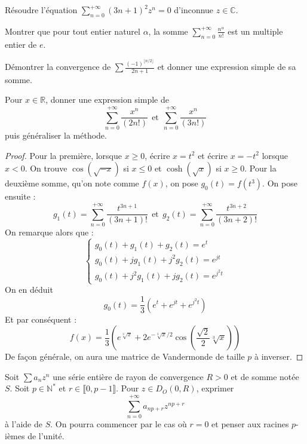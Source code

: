 \documentclass[french,a4paper]{article}
\newcommand{\N}{\mathbb{N}}
\newcommand{\R}{\mathbb{R}}
\newcommand{\C}{\mathbb{C}}
\newcommand{\st}{^*}
\theoremstyle{plain}
\theoremstyle{definition}
\theoremstyle{remark}
\begin{document}
\begin{ex}[Moulin.SE.25]{}
	Résoudre l'équation $\displaystyle\sum_{n=0}^{+\infty}(3n+1)^2z^n=0$ d'inconnue $z\in\C$.
\end{ex}

\begin{ex}[Moulin.SE.26]{}
	Montrer que pour tout entier naturel $\alpha$, la somme $\displaystyle\sum_{n=0}^{+\infty}\frac{n^\alpha}{n!}$ est un multiple entier de $e$.
\end{ex}

\begin{ex}[Moulin.SE.27]{}
	Démontrer la convergence de $\displaystyle\sum\frac{(-1)^{\lfloor n/2\rfloor}}{2n+1}$ et donner une expression simple de sa somme.
\end{ex}

\begin{ex}[Moulin.SE.28]{}
	Pour $x\in\R$, donner une expression simple de $$\sum_{n=0}^{+\infty}\frac{x^n}{(2n!)} \ \ \text{et}\ \ \sum_{n=0}^{+\infty}\frac{x^n}{(3n!)}$$ puis généraliser la méthode.
\end{ex}
\begin{proof}
	Pour la première, lorsque $x\geqslant0$, écrire $x=t^2$ et écrire $x=-t^2$ lorsque $x<0$. On trouve $\cos(\sqrt{-x})$ si $x\leqslant0$ et $\cosh(\sqrt{x})$ si $x\geqslant0$. Pour la deuxième somme, qu'on note comme $f(x)$, on pose $g_0(t)=f(t^3)$. On pose ensuite : $$g_1(t)=\sum_{n=0}^{+\infty}\frac{t^{3n+1}}{(3n+1)!} \ \ \text{et} \ \ g_2(t)=\sum_{n=0}^{+\infty}\frac{t^{3n+2}}{(3n+2)!}$$ On remarque alors que : $$\begin{cases}
		g_0(t)+g_1(t)+g_2(t)=e^t \\
		g_0(t)+jg_1(t)+j^2g_2(t)=e^{jt} \\
		g_0(t)+j^2g_1(t)+jg_2(t)=e^{j^2t}
	\end{cases}$$ On en déduit $$g_0(t)=\frac{1}{3}(e^{t}+e^{jt}+e^{j^2t})$$ Et par conséquent : $$f(x)=\frac{1}{3}\left(e^{\sqrt[3]{x}}+2e^{-\sqrt[3]{x}/2}\cos\left(\frac{\sqrt{2}}{2}\sqrt[3]{x}\right)\right)$$ De façon générale, on aura une matrice de Vandermonde de taille $p$ à inverser.
\end{proof}

\begin{ex}[Moulin.SE.29]{}
	Soit $\displaystyle\sum a_nz^n$ une série entière de rayon de convergence $R>0$ et de somme notée $S$. Soit $p\in\N\st$ et $r\in\llbracket0,p-1\rrbracket$. Pour $z\in D_O(0,R)$, exprimer $$\sum_{n=0}^{+\infty}a_{np+r}z^{np+r}$$ à l'aide de $S$. On pourra commencer par le cas où $r=0$ et penser aux racines $p$-ièmes de l'unité.
\end{ex}
\end{document}
